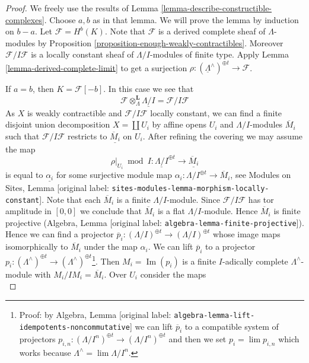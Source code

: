 \documentclass[10pt,a4paper]{article}
\theoremstyle{plain}
\theoremstyle{definition}
\theoremstyle{remark}
\numberwithin{equation}{subsection}
\def\lim{\mathop{\mathrm{lim}}\nolimits}
\def\Im{\mathop{\mathrm{Im}}}
\begin{document}
\begin{proof}
We freely use the results of
Lemma \ref{lemma-describe-constructible-complexes}.
Choose $a, b$ as in that lemma. We will prove the lemma by
induction on $b - a$. Let $\mathcal{F} = H^b(K)$.
Note that $\mathcal{F}$ is a derived complete sheaf of
$\Lambda$-modules by
Proposition \ref{proposition-enough-weakly-contractibles}.
Moreover $\mathcal{F}/I\mathcal{F}$ is a locally
constant sheaf of $\Lambda/I$-modules of finite type.
Apply Lemma \ref{lemma-derived-complete-limit} to get a surjection
$\rho : (\underline{\Lambda}^\wedge)^{\oplus t} \to \mathcal{F}$.

\medskip\noindent
If $a = b$, then $K = \mathcal{F}[-b]$. In this case we see that
$$
\mathcal{F} \otimes_\Lambda^\mathbf{L} \underline{\Lambda/I} =
\mathcal{F}/I\mathcal{F}
$$
As $X$ is weakly contractible and $\mathcal{F}/I\mathcal{F}$
locally constant, we can find a finite disjoint
union decomposition $X = \coprod U_i$ by affine opens $U_i$
and $\Lambda/I$-modules $\overline{M}_i$
such that $\mathcal{F}/I\mathcal{F}$ restricts to
$\underline{\overline{M}_i}$ on $U_i$. After refining the covering
we may assume the map
$$
\rho|_{U_i} \bmod I :
\underline{\Lambda/I}^{\oplus t}
\longrightarrow
\underline{\overline{M}_i}
$$
is equal to $\underline{\alpha_i}$ for some surjective module map
$\alpha_i : \Lambda/I^{\oplus t} \to \overline{M}_i$, see
Modules on Sites, Lemma [original label: \nolinkurl{sites-modules-lemma-morphism-locally-constant}].
Note that each $\overline{M}_i$ is a finite $\Lambda/I$-module.
Since $\mathcal{F}/I\mathcal{F}$ has tor amplitude in $[0, 0]$
we conclude that $\overline{M}_i$ is a flat $\Lambda/I$-module.
Hence $\overline{M}_i$ is finite projective
(Algebra, Lemma [original label: \nolinkurl{algebra-lemma-finite-projective}]).
Hence we can find a projector
$\overline{p}_i : (\Lambda/I)^{\oplus t} \to (\Lambda/I)^{\oplus t}$
whose image maps isomorphically to $\overline{M}_i$ under the map $\alpha_i$.
We can lift $\overline{p}_i$ to a projector
$p_i : (\Lambda^\wedge)^{\oplus t} \to
(\Lambda^\wedge)^{\oplus t}$\footnote{Proof: by
Algebra, Lemma [original label: \nolinkurl{algebra-lemma-lift-idempotents-noncommutative}]
we can lift $\overline{p}_i$ to a compatible system of
projectors $p_{i, n} : (\Lambda/I^n)^{\oplus t} \to (\Lambda/I^n)^{\oplus t}$
and then we set $p_i = \lim p_{i, n}$ which works because
$\Lambda^\wedge = \lim \Lambda/I^n$.}.
Then $M_i = \Im(p_i)$ is a finite $I$-adically complete
$\Lambda^\wedge$-module with $M_i/IM_i = \overline{M}_i$.
Over $U_i$ consider the maps
$$
$$
\end{proof}
\end{document}

